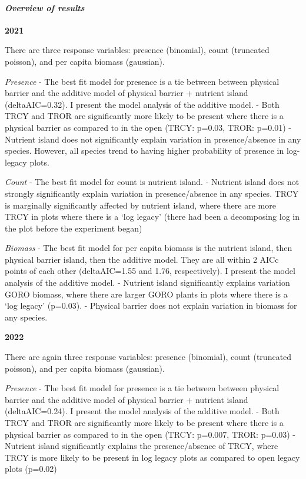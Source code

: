 \documentclass[
]{article}
\begin{document}
\hypertarget{overview-of-results-2}{%
\paragraph{\texorpdfstring{\emph{Overview of results}
}{Overview of results  }}\label{overview-of-results-2}}

\textbf{2021}

There are three response variables: presence (binomial), count
(truncated poisson), and per capita biomass (gaussian).

\emph{Presence} - The best fit model for presence is a tie between
between physical barrier and the additive model of physical barrier +
nutrient island (deltaAIC=0.32). I present the model analysis of the
additive model. - Both TRCY and TROR are significantly more likely to be
present where there is a physical barrier as compared to in the open
(TRCY: p=0.03, TROR: p=0.01) - Nutrient island does not significantly
explain variation in presence/absence in any species. However, all
species trend to having higher probability of presence in log-legacy
plots.

\emph{Count} - The best fit model for count is nutrient island. -
Nutrient island does not strongly significantly explain variation in
presence/absence in any species. TRCY is marginally significantly
affected by nutrient island, where there are more TRCY in plots where
there is a `log legacy' (there had been a decomposing log in the plot
before the experiment began)

\emph{Biomass} - The best fit model for per capita biomass is the
nutrient island, then physical barrier island, then the additive model.
They are all within 2 AICc points of each other (deltaAIC=1.55 and 1.76,
respectively). I present the model analysis of the additive model. -
Nutrient island significantly explains variation GORO biomass, where
there are larger GORO plants in plots where there is a `log legacy'
(p=0.03). - Physical barrier does not explain variation in biomass for
any species.

\textbf{2022}

There are again three response variables: presence (binomial), count
(truncated poisson), and per capita biomass (gaussian).

\emph{Presence} - The best fit model for presence is a tie between
between physical barrier and the additive model of physical barrier +
nutrient island (deltaAIC=0.24). I present the model analysis of the
additive model. - Both TRCY and TROR are significantly more likely to be
present where there is a physical barrier as compared to in the open
(TRCY: p=0.007, TROR: p=0.03) - Nutrient island significantly explains
the presence/absence of TRCY, where TRCY is more likely to be present in
log legacy plots as compared to open legacy plots (p=0.02)
\end{document}
